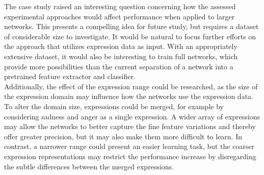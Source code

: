 The case study raised an interesting question concerning how the assessed experimental approaches would affect performance when applied to larger networks. This presents a compelling idea for future study, but requires a dataset of considerable size to investigate. It would be natural to focus further efforts on the approach that utilizes expression data as input. With an appropriately extensive dataset, it would also be interesting to train full networks, which provide more possibilities than the current separation of a network into a pretrained feature extractor and classifier. \\

\noindent Additionally, the effect of the expression range could be researched, as the size of the expression domain may influence how the networks use the expression data. To alter the domain size, expressions could be merged, for example by considering sadness and anger as a single expression. A wider array of expressions may allow the networks to better capture the fine feature variations and thereby offer greater precision, but it may also make them more difficult to learn. In contrast, a narrower range could present an easier learning task, but the coarser expression representations may restrict the performance increase by disregarding the subtle differences between the merged expressions.

\cleardoublepage